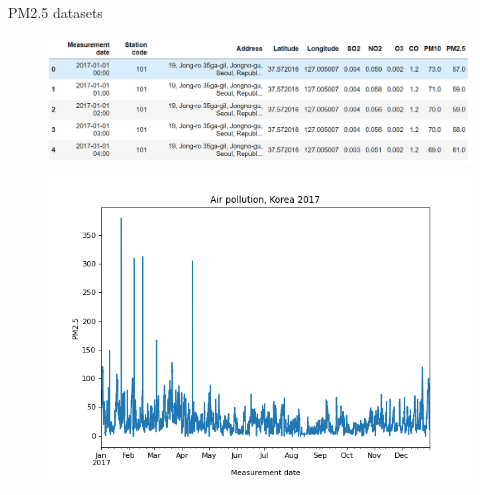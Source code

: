 \documentclass{beamer}
\begin{document}
	\begin{frame}[t]{PM2.5 datasets}
		\begin{figure}
			\centering
			\includegraphics[scale=0.3]{df.png}
			\includegraphics[scale=0.3]{pm25.png}
		\end{figure}
	\end{frame}
\end{document}

